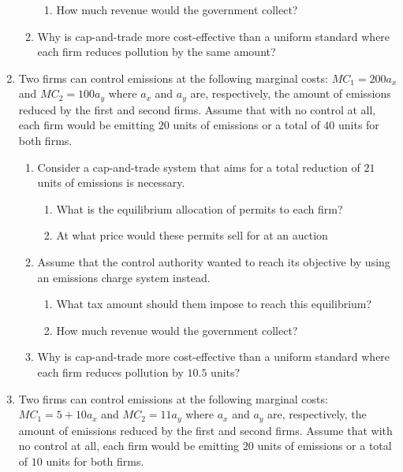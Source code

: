 \documentclass[11pt]{article}
\begin{document}
\begin{enumerate}
\begin{enumerate}
\begin{enumerate}
      \item How much revenue would the government collect?
    \end{enumerate}
  
    \item Why is cap-and-trade more cost-effective than a uniform standard where each firm reduces pollution by the same amount?
  \end{enumerate}

  \item Two firms can control emissions at the following marginal costs: $MC_1 = 200 a_x$ and $MC_2 = 100 a_y$ where $a_x$ and $a_y$ are, respectively, the amount of emissions reduced by the first and second firms. Assume that with no control at all, each firm would be emitting $20$ units of emissions or a total of $40$ units for both firms.

  \begin{enumerate}
    \item Consider a cap-and-trade system that aims for a total reduction of $21$ units of emissions is necessary. 
    \begin{enumerate}
      \item What is the equilibrium allocation of permits to each firm?
      \item At what price would these permits sell for at an auction
    \end{enumerate}

    \item Assume that the control authority wanted to reach its objective by using an emissions
    charge system instead.
    \begin{enumerate}
      \item What tax amount should them impose to reach this equilibrium?
      \item How much revenue would the government collect?
    \end{enumerate}

    \item Why is cap-and-trade more cost-effective than a uniform standard where each firm reduces pollution by $10.5$ units?
  \end{enumerate}

  \item Two firms can control emissions at the following marginal costs: $ MC_1 = 5 + 10 a_x $ and $MC_2 = 11 a_y$ where $a_x$ and $a_y$ are, respectively, the amount of emissions reduced by the first and second firms. Assume that with no control at all, each firm would be emitting $20$ units of emissions or a total of $10$ units for both firms.


\end{enumerate}
\end{document}
